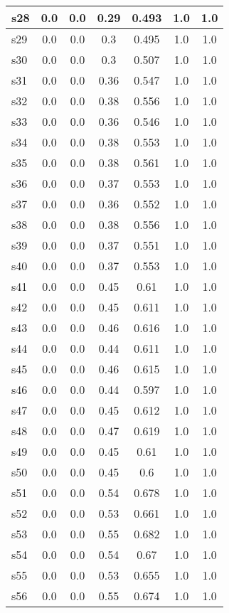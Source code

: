 \documentclass{article}
\begin{document}
\begin{tabular}{|l|c|c|c|c|c|c|}
\hline
s28 &0.0 & 0.0 & 0.29 & 0.493 & 1.0 & 1.0\\
\hline
s29 &0.0 & 0.0 & 0.3 & 0.495 & 1.0 & 1.0\\
\hline
s30 &0.0 & 0.0 & 0.3 & 0.507 & 1.0 & 1.0\\
\hline
s31 &0.0 & 0.0 & 0.36 & 0.547 & 1.0 & 1.0\\
\hline
s32 &0.0 & 0.0 & 0.38 & 0.556 & 1.0 & 1.0\\
\hline
s33 &0.0 & 0.0 & 0.36 & 0.546 & 1.0 & 1.0\\
\hline
s34 &0.0 & 0.0 & 0.38 & 0.553 & 1.0 & 1.0\\
\hline
s35 &0.0 & 0.0 & 0.38 & 0.561 & 1.0 & 1.0\\
\hline
s36 &0.0 & 0.0 & 0.37 & 0.553 & 1.0 & 1.0\\
\hline
s37 &0.0 & 0.0 & 0.36 & 0.552 & 1.0 & 1.0\\
\hline
s38 &0.0 & 0.0 & 0.38 & 0.556 & 1.0 & 1.0\\
\hline
s39 &0.0 & 0.0 & 0.37 & 0.551 & 1.0 & 1.0\\
\hline
s40 &0.0 & 0.0 & 0.37 & 0.553 & 1.0 & 1.0\\
\hline
s41 &0.0 & 0.0 & 0.45 & 0.61 & 1.0 & 1.0\\
\hline
s42 &0.0 & 0.0 & 0.45 & 0.611 & 1.0 & 1.0\\
\hline
s43 &0.0 & 0.0 & 0.46 & 0.616 & 1.0 & 1.0\\
\hline
s44 &0.0 & 0.0 & 0.44 & 0.611 & 1.0 & 1.0\\
\hline
s45 &0.0 & 0.0 & 0.46 & 0.615 & 1.0 & 1.0\\
\hline
s46 &0.0 & 0.0 & 0.44 & 0.597 & 1.0 & 1.0\\
\hline
s47 &0.0 & 0.0 & 0.45 & 0.612 & 1.0 & 1.0\\
\hline
s48 &0.0 & 0.0 & 0.47 & 0.619 & 1.0 & 1.0\\
\hline
s49 &0.0 & 0.0 & 0.45 & 0.61 & 1.0 & 1.0\\
\hline
s50 &0.0 & 0.0 & 0.45 & 0.6 & 1.0 & 1.0\\
\hline
s51 &0.0 & 0.0 & 0.54 & 0.678 & 1.0 & 1.0\\
\hline
s52 &0.0 & 0.0 & 0.53 & 0.661 & 1.0 & 1.0\\
\hline
s53 &0.0 & 0.0 & 0.55 & 0.682 & 1.0 & 1.0\\
\hline
s54 &0.0 & 0.0 & 0.54 & 0.67 & 1.0 & 1.0\\
\hline
s55 &0.0 & 0.0 & 0.53 & 0.655 & 1.0 & 1.0\\
\hline
s56 &0.0 & 0.0 & 0.55 & 0.674 & 1.0 & 1.0\\

\end{tabular}
\end{document}

